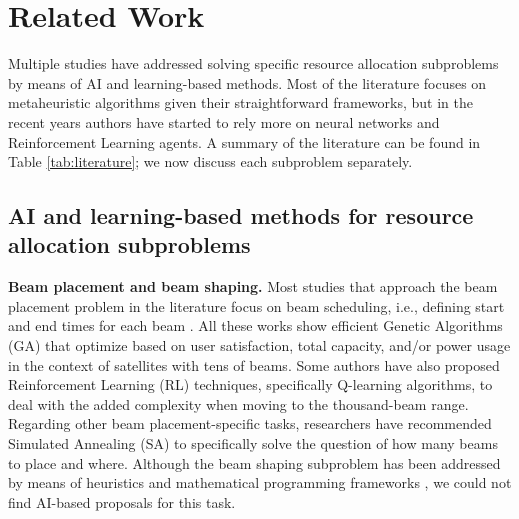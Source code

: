 \documentclass[letterpaper]{article} %
\begin{document}
\section{Related Work}


Multiple studies have addressed solving specific resource allocation subproblems by means of AI and learning-based methods. Most of the literature focuses on metaheuristic algorithms given their straightforward frameworks, but in the recent years authors have started to rely more on neural networks and Reinforcement Learning agents. A summary of the literature can be found in Table \ref{tab:literature}; we now discuss each subproblem separately.

\subsection{AI and learning-based methods for resource allocation subproblems}

\textbf{Beam placement and beam shaping.} Most studies that approach the beam placement problem in the literature focus on beam scheduling, i.e., defining start and end times for each beam \cite{wangdynamic, Deng2018, He2017, Anzalchi2010, Angeletti2006}. All these works show efficient Genetic Algorithms (GA) that optimize based on user satisfaction, total capacity, and/or power usage in the context of satellites with tens of beams. Some authors \cite{hu2020dynamic} have also proposed Reinforcement Learning (RL) techniques, specifically Q-learning algorithms, to deal with the added complexity when moving to the thousand-beam range. Regarding other beam placement-specific tasks, researchers have recommended Simulated Annealing (SA) \cite{Camino2014} to specifically solve the question of how many beams to place and where. Although the beam shaping subproblem has been addressed by means of heuristics and mathematical programming frameworks \cite{kyrgiazos2013irregular, camino2016mixed}, we could not find AI-based proposals for this task.

\end{document}
